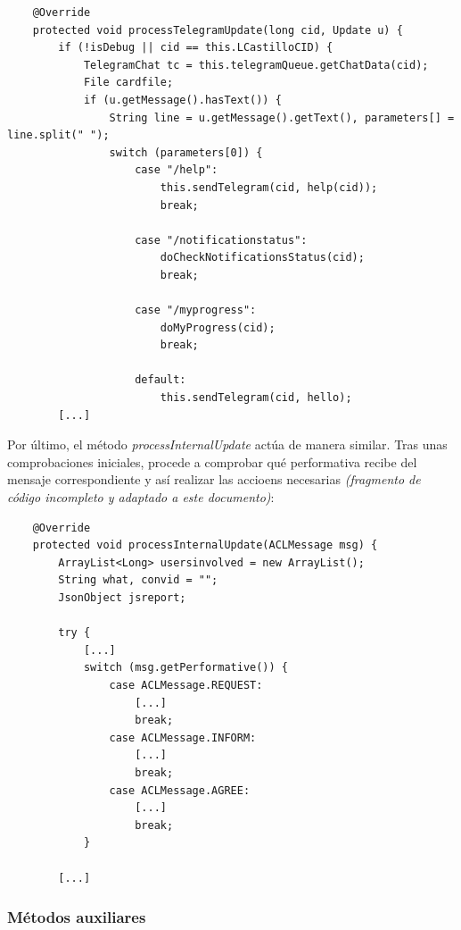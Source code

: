 \begin{lstlisting}
    @Override
    protected void processTelegramUpdate(long cid, Update u) {
        if (!isDebug || cid == this.LCastilloCID) {
            TelegramChat tc = this.telegramQueue.getChatData(cid);
            File cardfile;
            if (u.getMessage().hasText()) {
                String line = u.getMessage().getText(), parameters[] = line.split(" ");
                switch (parameters[0]) {
                    case "/help":
                        this.sendTelegram(cid, help(cid));
                        break;
                        
                    case "/notificationstatus":
                        doCheckNotificationsStatus(cid);
                        break;
                        
                    case "/myprogress":
                        doMyProgress(cid);
                        break;
                        
                    default:
                        this.sendTelegram(cid, hello);
        [...]
\end{lstlisting}

Por último, el método \textit{processInternalUpdate} actúa de manera similar. Tras unas comprobaciones iniciales, procede a comprobar qué performativa recibe del mensaje correspondiente y así realizar las accioens necesarias \textit{(fragmento de código incompleto y adaptado a este documento)}:\\

\begin{lstlisting}
    @Override
    protected void processInternalUpdate(ACLMessage msg) {
        ArrayList<Long> usersinvolved = new ArrayList();
        String what, convid = "";
        JsonObject jsreport;

        try {
            [...]
            switch (msg.getPerformative()) {
                case ACLMessage.REQUEST:
                    [...]
                    break;
                case ACLMessage.INFORM:
                    [...]
                    break;
                case ACLMessage.AGREE:
                    [...]
                    break;
            }
            
        [...]
\end{lstlisting}

\subsubsection{Métodos auxiliares}

